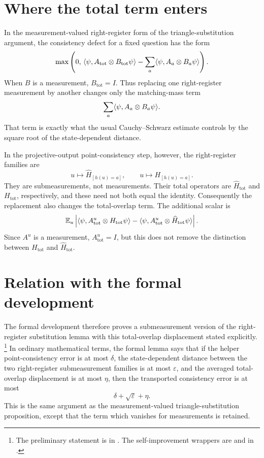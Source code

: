 \documentclass[11pt]{article}
\begin{document}
\section{Where the total term enters}

In the measurement-valued right-register form of the triangle-substitution
argument, the consistency defect for a fixed question has the form
\[
  \max\left(0,\,
    \langle \psi, A_{\mathrm{tot}} \otimes B_{\mathrm{tot}} \psi\rangle
    - \sum_a \langle \psi, A_a \otimes B_a \psi\rangle\right).
\]
When $B$ is a measurement, $B_{\mathrm{tot}} = I$.  Thus replacing one
right-register measurement by another changes only the matching-mass term
\[
  \sum_a \langle \psi, A_a \otimes B_a \psi\rangle.
\]
That term is exactly what the usual Cauchy--Schwarz estimate controls by the
square root of the state-dependent distance.

In the projective-output point-consistency step, however, the right-register
families are
\[
  u \longmapsto \widehat H_{[h(u)=a]},
  \qquad
  u \longmapsto H_{[h(u)=a]}.
\]
They are submeasurements, not measurements.  Their total operators are
$\widehat H_{\mathrm{tot}}$ and $H_{\mathrm{tot}}$, respectively, and these need
not both equal the identity.  Consequently the replacement also changes the
total-overlap term.  The additional scalar is
\[
  \mathbb E_u \left|
    \langle \psi, A^u_{\mathrm{tot}} \otimes H_{\mathrm{tot}} \psi\rangle
    -
    \langle \psi, A^u_{\mathrm{tot}} \otimes \widehat H_{\mathrm{tot}} \psi\rangle
  \right|.
\]
Since $A^u$ is a measurement, $A^u_{\mathrm{tot}} = I$, but this does not remove
the distinction between $H_{\mathrm{tot}}$ and $\widehat H_{\mathrm{tot}}$.

\section{Relation with the formal development}

The formal development therefore proves a submeasurement version of the
right-register substitution lemma with this total-overlap displacement stated
explicitly.%
\footnote{The preliminary statement is
 in
.  The self-improvement
wrappers are  and
 in
.}
In ordinary mathematical terms, the formal lemma says that if the helper
point-consistency error is at most $\delta$, the state-dependent distance
between the two right-register submeasurement families is at most $\varepsilon$,
and the averaged total-overlap displacement is at most $\eta$, then the
transported consistency error is at most
\[
  \delta + \sqrt{\varepsilon} + \eta.
\]
This is the same argument as the measurement-valued triangle-substitution
proposition, except that the term which vanishes for measurements is retained.
\end{document}
